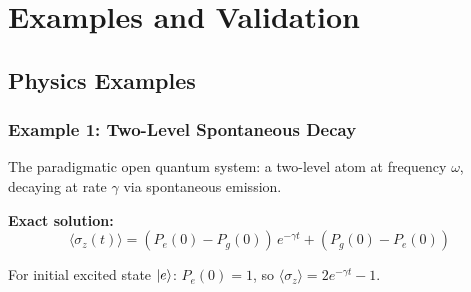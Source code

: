 \documentclass[11pt,a4paper,twoside]{book}
\theoremstyle{definition}
\theoremstyle{remark}
\begin{document}
\part{Examples and Validation}

\chapter{Physics Examples}
\label{chap:examples}

\section{Example 1: Two-Level Spontaneous Decay}
\label{sec:ex-two-level}

The paradigmatic open quantum system: a two-level atom at frequency
$\omega$, decaying at rate $\gamma$ via spontaneous emission.

\textbf{Exact solution:}
\begin{equation}
  \langle\sigma_z(t)\rangle = (P_e(0) - P_g(0))\,e^{-\gamma t}
    + (P_g(0) - P_e(0))
  \label{eq:two-level-exact-general}
\end{equation}

For initial excited state $\ket{e}$: $P_e(0) = 1$, so
$\langle\sigma_z\rangle = 2e^{-\gamma t} - 1$.
\end{document}
